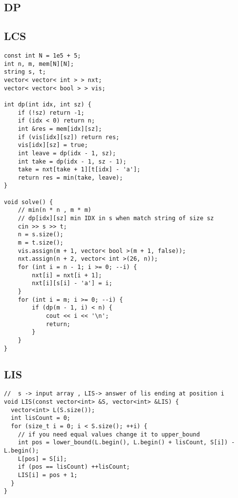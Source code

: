 \documentclass[twoside]{article}
\begin{document}
\begin{multicols*}{2}
{
\section*{DP}
}
{
\subsection*{LCS}
}
\begin{verbatim}
const int N = 1e5 + 5;
int n, m, mem[N][N];
string s, t;
vector< vector< int > > nxt;
vector< vector< bool > > vis;

int dp(int idx, int sz) {
    if (!sz) return -1;
    if (idx < 0) return n;
    int &res = mem[idx][sz];
    if (vis[idx][sz]) return res;
    vis[idx][sz] = true;
    int leave = dp(idx - 1, sz);
    int take = dp(idx - 1, sz - 1);
    take = nxt[take + 1][t[idx] - 'a'];
    return res = min(take, leave);
}

void solve() {
    // min(n * n , m * m)
    // dp[idx][sz] min IDX in s when match string of size sz
    cin >> s >> t;
    n = s.size();
    m = t.size();
    vis.assign(m + 1, vector< bool >(m + 1, false));
    nxt.assign(n + 2, vector< int >(26, n));
    for (int i = n - 1; i >= 0; --i) {
        nxt[i] = nxt[i + 1];
        nxt[i][s[i] - 'a'] = i;
    }
    for (int i = m; i >= 0; --i) {
        if (dp(m - 1, i) < n) {
            cout << i << '\n';
            return;
        }
    }
}
\end{verbatim}

{
\subsection*{LIS}
}
\begin{verbatim}
//  s -> input array , LIS-> answer of lis ending at position i
void LIS(const vector<int> &S, vector<int> &LIS) {
  vector<int> L(S.size());
  int lisCount = 0;
  for (size_t i = 0; i < S.size(); ++i) {
    // if you need equal values change it to upper_bound
    int pos = lower_bound(L.begin(), L.begin() + lisCount, S[i]) - L.begin();
    L[pos] = S[i];
    if (pos == lisCount) ++lisCount;
    LIS[i] = pos + 1;
  }
}
\end{verbatim}


\end{multicols*}
\end{document}
